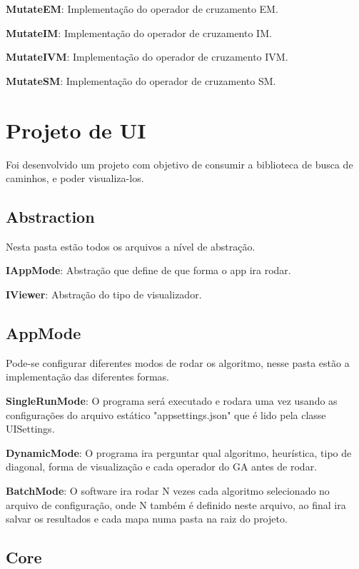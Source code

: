  \textbf{MutateEM}: Implementação do operador de cruzamento EM.
 
 \textbf{MutateIM}: Implementação do operador de cruzamento IM.
 
 \textbf{MutateIVM}: Implementação do operador de cruzamento IVM.
 
 \textbf{MutateSM}: Implementação do operador de cruzamento SM.
 
 
 \section{Projeto de UI}
 
 Foi desenvolvido um projeto com objetivo de consumir a biblioteca de busca de caminhos, e poder visualiza-los.
 
 \subsection{Abstraction}
 
 Nesta pasta estão todos os arquivos a nível de abstração.
 
 \textbf{IAppMode}: Abstração que define de que forma o app ira rodar.
 
 \textbf{IViewer}: Abstração do tipo de visualizador.
 
 \subsection{AppMode}
 
 Pode-se configurar diferentes modos de rodar os algoritmo, nesse pasta estão a implementação das diferentes formas.
 
 \textbf{SingleRunMode}: O programa será executado e rodara uma vez usando as configurações do arquivo estático "appsettings.json" que é lido pela classe UISettings.
 
 \textbf{DynamicMode}: O programa ira perguntar qual algoritmo, heurística, tipo de diagonal, forma de visualização e cada operador do GA antes de rodar.
 
 \textbf{BatchMode}: O software ira rodar N vezes cada algoritmo selecionado no arquivo de configuração, onde N também é definido neste arquivo, ao final ira salvar os resultados e cada mapa numa pasta na raiz do projeto.
 
 
 \subsection{Core}
 
